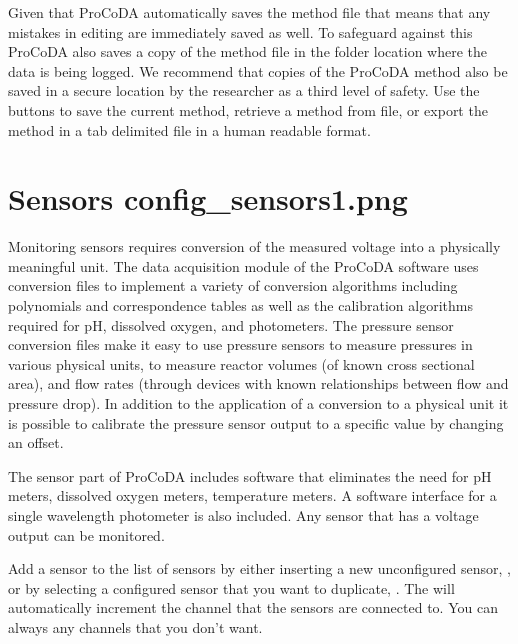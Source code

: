 \documentclass[letterpaper,10pt,english]{sphinxmanual}
\begin{document}
Given that ProCoDA automatically saves the method file that means that any mistakes in editing are immediately saved as well. To safeguard against this ProCoDA also saves a copy of the method file in the folder location where the data is being logged. We recommend that copies of the ProCoDA method also be saved in a secure location by the researcher as a third level of safety. Use the  buttons to save the current method, retrieve a method from file, or export the method in a tab delimited file in a human readable format.


\section[Sensors]{Sensors \lowercase{\sphinxincludegraphics}{{config_sensors1}.png}}
\label{\detokenize{ProCoDA/ProCoDA:sensors-config-sensors}}\label{\detokenize{ProCoDA/ProCoDA:heading-procoda-sensors}}
Monitoring sensors requires conversion of the measured voltage into a physically meaningful unit. The data acquisition module of the ProCoDA software uses conversion files to implement a variety of conversion algorithms including polynomials and correspondence tables as well as the calibration algorithms required for pH, dissolved oxygen, and photometers. The pressure sensor conversion files make it easy to use pressure sensors to measure pressures in various physical units, to measure reactor volumes (of known cross sectional area), and flow rates (through devices with known relationships between flow and pressure drop). In addition to the application of a conversion to a physical unit it is possible to calibrate the pressure sensor output to a specific value by changing an offset.

The sensor part of ProCoDA includes software that eliminates the need for pH meters, dissolved oxygen meters, temperature meters. A software interface for a single wavelength photometer is also included. Any sensor that has a voltage output can be monitored.

Add a sensor to the list of sensors by either inserting a new unconfigured sensor, , or by selecting a configured sensor that you want to duplicate, . The  will automatically increment the channel that the sensors are connected to. You can always  any channels that you don’t want.
\end{document}
